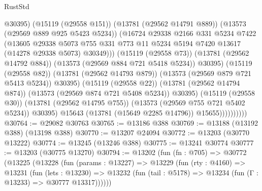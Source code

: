 \begin{lexlean}{RustStd}
\begin{coremodule}
                                    @30395)
                                  (@15119 (@29558 @151))
                                  (@13781 (@29562 @14791 @889))
                                  (@13573 (@29569 @889 @925 @5423 @5234))
                                  (@16724
                                    @29338
                                    @2166
                                    @331
                                    @5234
                                    @7422
                                    (@13605
                                      @29338
                                      @5073
                                      @755
                                      @331
                                      @773
                                      @11
                                      @5234
                                      @5194
                                      @7420
                                      @13617
                                      (@14278 @29338 @5073)
                                      @30349)))
                                (@15119 (@29558 @73))
                                (@13781 (@29562 @14792 @884))
                                (@13573 (@29569 @884 @721 @5418 @5234))
                                @30395)
                              (@15119 (@29558 @82))
                              (@13781 (@29562 @14793 @879))
                              (@13573 (@29569 @879 @721 @5413 @5234))
                              @30395)
                            (@15119 (@29558 @22))
                            (@13781 (@29562 @14794 @874))
                            (@13573 (@29569 @874 @721 @5408 @5234))
                            @30395)
                          (@15119 (@29558 @30))
                          (@13781 (@29562 @14795 @755))
                          (@13573 (@29569 @755 @721 @5402 @5234))
                          @30395)
                        @15643
                        (@13781 (@15649 @2285 @14796))
                        @15655))))))))))
@30764 := @29082 @30763
@30765 := @13186 @388
@30769 := @13188 (@13192 @388) (@13198 @388)
@30770 := @13207 @24094
@30772 := @13203 (@30770 @13222)
@30774 := @13245 (@13246 @388)
@30775 := @13241 @30774
@30777 := @13203 (@30775 @13270)
@30794 := @13202
    (fun (fn : @705) =>
    @30772
      (@13225
        (@13228
          (fun (params : @13227) =>
          @13229
            (fun (rty : @4160) =>
            @13231
              (fun (lets : @13230) =>
              @13232 (fun (tail : @5178) => @13234 (fun (Γ : @13233) => @30777 @13317))))))

\end{coremodule}
\end{lexlean}
